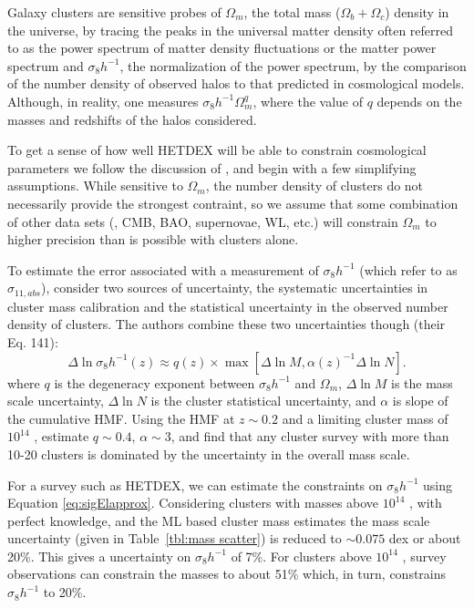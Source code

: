 \documentclass[fleqn,usenatbib]{mnras}
\begin{document}
Galaxy clusters are sensitive probes of $\Omega_m$, the total mass ($\Omega_b + \Omega_c$) density in the universe, by tracing the peaks in the universal matter density often referred to as the power spectrum of matter density fluctuations or the matter power spectrum and $\sigma_8h^{-1}$, the normalization of the power spectrum, by the comparison of the number density of observed halos to that predicted in cosmological models. Although, in reality, one measures $\sigma_8h^{-1}\Omega_m^q$, where the value of $q$ depends on the masses and redshifts of the halos considered.

To get a sense of how well HETDEX will be able to constrain cosmological parameters we follow the discussion of \cite{Weinberg2013}, and begin with a few simplifying assumptions. While sensitive to $\Omega_m$, the number density of clusters do not necessarily provide the strongest contraint, so we assume that some combination of other data sets (\eg, CMB, BAO, supernovae, WL, etc.) will constrain $\Omega_m$ to higher precision than is possible with clusters alone. 

To estimate the error associated with a measurement of $\sigma_8h^{-1}$ (which \citealt{Weinberg2013} refer to as $\sigma_{11,abs}$), \cite{Weinberg2013} consider two sources of uncertainty, the systematic uncertainties in cluster mass calibration and the statistical uncertainty in the observed number density of clusters. The authors combine these two uncertainties though (their Eq. 141):
\begin{equation}
\Delta \ln \sigma_8h^{-1}(z) \approx q(z)\times 
        \max\left[ \Delta \ln M, \alpha(z)^{-1} \Delta \ln N \right].
\label{eq:sigElapprox}
\end{equation}
where $q$ is the degeneracy exponent between $\sigma_8h^{-1}$ and $\Omega_m$, $\Delta \ln M$ is the mass scale uncertainty, $\Delta \ln N$ is the cluster statistical uncertainty, and $\alpha$ is slope of the cumulative HMF. Using the \cite{Tinker2008} HMF at $z\sim0.2$ and a limiting cluster mass of $10^{14}$ \Msol, \cite{Weinberg2013} estimate $q\sim0.4$, $\alpha\sim3$, and find that any cluster survey with more than 10-20 clusters is dominated by the uncertainty in the overall mass scale.

For a survey such as HETDEX, we can estimate the constraints on $\sigma_8h^{-1}$ using Equation \ref{eq:sigElapprox}. Considering clusters with masses above $10^{14}$ \Msol, with perfect knowledge, and the ML based cluster mass estimates the mass scale uncertainty (given in Table~\ref{tbl:mass scatter}) is reduced to $\sim 0.075$ dex or about 20\%. This gives a uncertainty on $\sigma_8h^{-1}$ of 7\%. For clusters above $10^{14}$ \Msol, survey observations can constrain the masses to about 51\% which, in turn, constrains $\sigma_8h^{-1}$ to 20\%.
\end{document}
